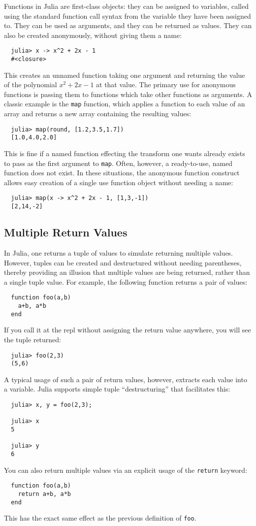 \documentclass{article}
\begin{document}
Functions in Julia are first-class objects:
they can be assigned to variables, called using the standard function call syntax from the variable they have been assigned to.
They can be used as arguments, and they can be returned as values.
They can also be created anonymously, without giving them a name:
\begin{verbatim}
  julia> x -> x^2 + 2x - 1
  #<closure>
\end{verbatim}
This creates an unnamed function taking one argument and returning the value of the polynomial $x^2 + 2x - 1$ at that value.
The primary use for anonymous functions is passing them to functions which take other functions as arguments.
A classic example is the \verb|map| function, which applies a function to each value of an array and returns a new array containing the resulting values:
\begin{verbatim}
  julia> map(round, [1.2,3.5,1.7])
  [1.0,4.0,2.0]
\end{verbatim}
This is fine if a named function effecting the transform one wants already exists to pass as the first argument to \verb|map|.
Often, however, a ready-to-use, named function does not exist.
In these situations, the anonymous function construct allows easy creation of a single use function object without needing a name:
\begin{verbatim}
  julia> map(x -> x^2 + 2x - 1, [1,3,-1])
  [2,14,-2]
\end{verbatim}

\subsection{Multiple Return Values}

In Julia, one returns a tuple of values to simulate returning multiple values.
However, tuples can be created and destructured without needing parentheses, thereby providing an illusion that multiple values are being returned, rather than a single tuple value.
For example, the following function returns a pair of values:
\begin{verbatim}
  function foo(a,b)
    a+b, a*b
  end
\end{verbatim}
If you call it at the repl without assigning the return value anywhere, you will see the tuple returned:
\begin{verbatim}
  julia> foo(2,3)
  (5,6)
\end{verbatim}
A typical usage of such a pair of return values, however, extracts each value into a variable.
Julia supports simple tuple ``destructuring'' that facilitates this:
\begin{verbatim}
  julia> x, y = foo(2,3);

  julia> x
  5

  julia> y
  6
\end{verbatim}
You can also return multiple values via an explicit usage of the \verb|return| keyword:
\begin{verbatim}
  function foo(a,b)
    return a+b, a*b
  end
\end{verbatim}
This has the exact same effect as the previous definition of \verb|foo|.
\end{document}
